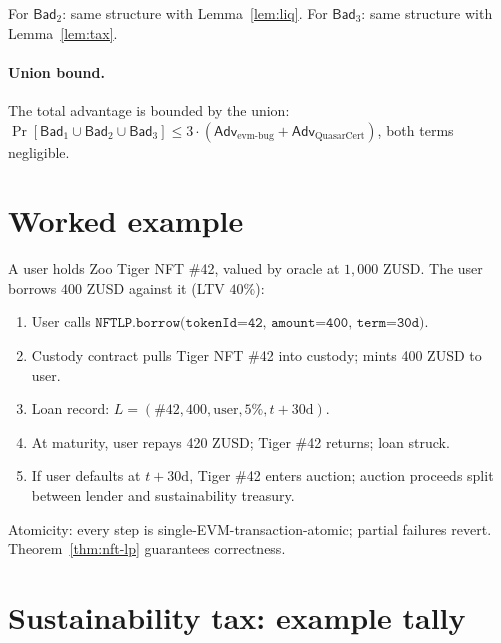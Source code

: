 \documentclass[11pt]{article}
\begin{document}
For $\mathsf{Bad}_2$: same structure with Lemma~\ref{lem:liq}.
For $\mathsf{Bad}_3$: same structure with Lemma~\ref{lem:tax}.

\paragraph{Union bound.}
The total advantage is bounded by the union:
$\Pr[\mathsf{Bad}_1 \cup \mathsf{Bad}_2 \cup \mathsf{Bad}_3] \leq
3 \cdot (\mathsf{Adv}_{\mathrm{evm\text{-}bug}} +
        \mathsf{Adv}_{\mathrm{QuasarCert}})$,
both terms negligible.

\section{Worked example}
\label{sec:example}

A user holds Zoo Tiger NFT \#42, valued by oracle at $1{,}000$
ZUSD. The user borrows $400$ ZUSD against it (LTV $40\%$):

\begin{enumerate}[nosep]
  \item User calls
        $\texttt{NFTLP.borrow(tokenId=42, amount=400, term=30d)}$.
  \item Custody contract pulls Tiger NFT \#42 into custody;
        mints 400 ZUSD to user.
  \item Loan record:
        $L = (\#42, 400, \mathrm{user}, 5\%, t + 30\mathrm{d})$.
  \item At maturity, user repays 420 ZUSD; Tiger \#42 returns;
        loan struck.
  \item If user defaults at $t + 30\mathrm{d}$, Tiger \#42 enters
        auction; auction proceeds split between lender and
        sustainability treasury.
\end{enumerate}

Atomicity: every step is single-EVM-transaction-atomic; partial
failures revert.  Theorem~\ref{thm:nft-lp} guarantees correctness.

\section{Sustainability tax: example tally}
\label{sec:sustain-example}
\end{document}
